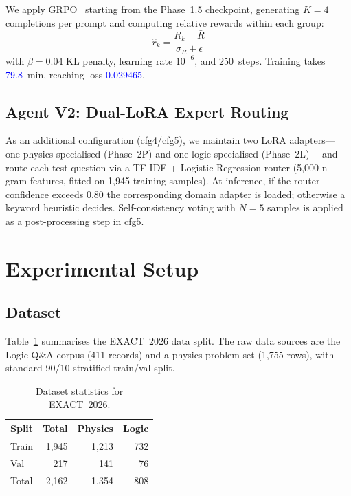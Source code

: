 \documentclass{ieeeaccess}
\newcommand{\fill}[1]{\textcolor{blue}{#1}}  %
\newcommand{\dataset}{EXACT~2026}
\begin{document}
We apply GRPO~\cite{Shao2024} starting from the Phase~1.5 checkpoint,
generating $K=4$ completions per prompt and computing relative rewards
within each group:
\begin{equation}
  \hat{r}_k = \frac{R_k - \bar{R}}{\sigma_R + \epsilon}
\end{equation}
with $\beta = 0.04$ KL penalty, learning rate $10^{-6}$, and 250~steps.
Training takes \fill{79.8}~min, reaching loss \fill{0.029465}.

\subsection{Agent V2: Dual-LoRA Expert Routing}

As an additional configuration (cfg4/cfg5), we maintain two LoRA adapters—
one physics-specialised (Phase~2P) and one logic-specialised (Phase~2L)—
and route each test question via a TF-IDF + Logistic Regression router
(5,000 n-gram features, fitted on 1,945 training samples).
At inference, if the router confidence exceeds 0.80 the corresponding
domain adapter is loaded; otherwise a keyword heuristic decides.
Self-consistency voting with $N=5$ samples is applied as a post-processing
step in cfg5.

\section{Experimental Setup}
\label{sec:setup}

\subsection{Dataset}

Table~\ref{tab:dataset} summarises the \dataset{} data split.
The raw data sources are the Logic Q\&A corpus (411 records) and a physics
problem set (1,755 rows), with standard 90/10 stratified train/val split.

\begin{table}[t]
  \centering
  \caption{Dataset statistics for \dataset{}.}
  \label{tab:dataset}
  \begin{tabular}{lrrr}
    \toprule
    Split   & Total & Physics & Logic \\
    \midrule
    Train   & 1,945 & 1,213 & 732 \\
    Val     & 217   & 141   & 76  \\
    \midrule
    Total   & 2,162 & 1,354 & 808 \\
    \bottomrule
  \end{tabular}
\end{table}
\end{document}
